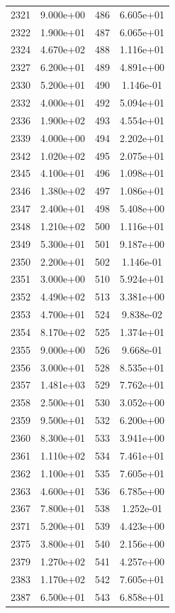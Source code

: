 \documentclass[12pt]{article}
\begin{document}
\begin{longtable}{@{}cccc@{}}
2321 & 9.000e+00 & 486 & 6.605e+01 \\
2322 & 1.900e+01 & 487 & 6.065e+01 \\
2324 & 4.670e+02 & 488 & 1.116e+01 \\
2327 & 6.200e+01 & 489 & 4.891e+00 \\
2330 & 5.200e+01 & 490 & 1.146e-01 \\
2332 & 4.000e+01 & 492 & 5.094e+01 \\
2336 & 1.900e+02 & 493 & 4.554e+01 \\
2339 & 4.000e+00 & 494 & 2.202e+01 \\
2342 & 1.020e+02 & 495 & 2.075e+01 \\
2345 & 4.100e+01 & 496 & 1.098e+01 \\
2346 & 1.380e+02 & 497 & 1.086e+01 \\
2347 & 2.400e+01 & 498 & 5.408e+00 \\
2348 & 1.210e+02 & 500 & 1.116e+01 \\
2349 & 5.300e+01 & 501 & 9.187e+00 \\
2350 & 2.200e+01 & 502 & 1.146e-01 \\
2351 & 3.000e+00 & 510 & 5.924e+01 \\
2352 & 4.490e+02 & 513 & 3.381e+00 \\
2353 & 4.700e+01 & 524 & 9.838e-02 \\
2354 & 8.170e+02 & 525 & 1.374e+01 \\
2355 & 9.000e+00 & 526 & 9.668e-01 \\
2356 & 3.000e+01 & 528 & 8.535e+01 \\
2357 & 1.481e+03 & 529 & 7.762e+01 \\
2358 & 2.500e+01 & 530 & 3.052e+00 \\
2359 & 9.500e+01 & 532 & 6.200e+00 \\
2360 & 8.300e+01 & 533 & 3.941e+00 \\
2361 & 1.110e+02 & 534 & 7.461e+01 \\
2362 & 1.100e+01 & 535 & 7.605e+01 \\
2363 & 4.600e+01 & 536 & 6.785e+00 \\
2367 & 7.800e+01 & 538 & 1.252e-01 \\
2371 & 5.200e+01 & 539 & 4.423e+00 \\
2375 & 3.800e+01 & 540 & 2.156e+00 \\
2379 & 1.270e+02 & 541 & 4.257e+00 \\
2383 & 1.170e+02 & 542 & 7.605e+01 \\
2387 & 6.500e+01 & 543 & 6.858e+01 \\

\end{longtable}
\end{document}
